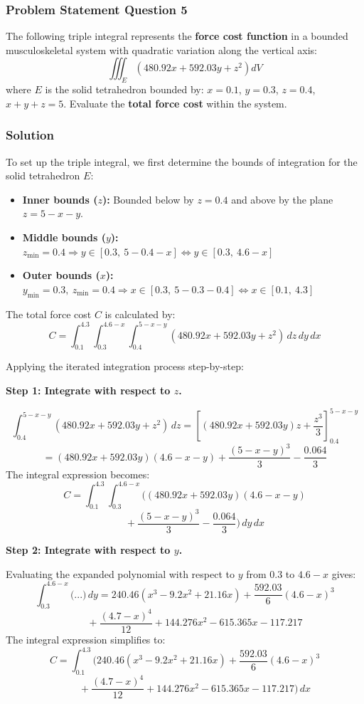 \subsubsection*{Problem Statement Question 5}
The following triple integral represents the \textbf{force cost function} in a bounded musculoskeletal system with quadratic variation along the vertical axis:
\[ \iiint_{E}(480.92x+592.03y+z^{2})dV \]
where $E$ is the solid tetrahedron bounded by: $x=0.1$, $y=0.3$, $z=0.4$, $x+y+z=5$. Evaluate the \textbf{total force cost} within the system.

\subsubsection*{Solution}
To set up the triple integral, we first determine the bounds of integration for the solid tetrahedron $E$:
\begin{itemize}
	\item \textbf{Inner bounds ($z$):} Bounded below by $z=0.4$ and above by the plane $z=5-x-y$.
	\item \textbf{Middle bounds ($y$):} $ z_{\text{min}} = 0.4 \Rightarrow y \in{[ 0.3,\ 5 - 0.4 - x]} \iff y \in{[ 0.3,\ 4.6 - x]}  $
	\item \textbf{Outer bounds ($x$):} $ y_{\text{min}} = 0.3,\ z_{\text{min}} = 0.4 \Rightarrow x \in{[ 0.3,\ 5 - 0.3 - 0.4]} \iff x \in{[ 0.1,\ 4.3]} $
\end{itemize}

The total force cost $C$ is calculated by:
\[ C = \int_{0.1}^{4.3} \int_{0.3}^{4.6-x} \int_{0.4}^{5-x-y} (480.92x + 592.03y + z^2) \, dz \, dy \, dx \]

Applying the iterated integration process step-by-step:

\vspace{1cm}
\noindent\textbf{Step 1: Integrate with respect to $z$.}

\[ \int_{0.4}^{5-x-y} (480.92x + 592.03y + z^2) \, dz = \left[ (480.92x + 592.03y)z + \frac{z^3}{3} \right]_{0.4}^{5-x-y} \]
\[ = (480.92x + 592.03y)(4.6-x-y) + \frac{(5-x-y)^3}{3} - \frac{0.064}{3} \]
The integral expression becomes:
\[ C = \int_{0.1}^{4.3} \int_{0.3}^{4.6-x} \Bigg( (480.92x + 592.03y)(4.6-x-y) \]
\[ \qquad + \frac{(5-x-y)^3}{3} - \frac{0.064}{3} \Bigg) \, dy \, dx \]

\vspace{1cm}
\noindent\textbf{Step 2: Integrate with respect to $y$.}

Evaluating the expanded polynomial with respect to $y$ from $0.3$ to $4.6-x$ gives:
\[ \int_{0.3}^{4.6-x} \Big( ... \Big) \, dy = 240.46(x^3 - 9.2x^2 + 21.16x) + \frac{592.03}{6}(4.6-x)^3 \]
\[ \qquad + \frac{(4.7-x)^4}{12} + 144.276x^2 - 615.365x - 117.217 \]
The integral expression simplifies to:
\[ C = \int_{0.1}^{4.3} \Bigg( 240.46(x^3 - 9.2x^2 + 21.16x) + \frac{592.03}{6}(4.6-x)^3 \]
\[ \qquad + \frac{(4.7-x)^4}{12} + 144.276x^2 - 615.365x - 117.217 \Bigg) \, dx \]


